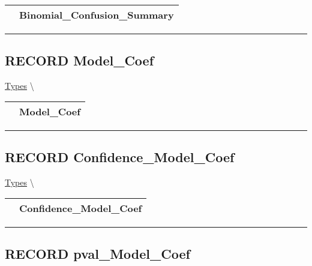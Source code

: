 {\renewcommand{\arraystretch}{1.5}
\begin{tabularx}{\textwidth}{|>{\raggedright\arraybackslash}l|X|}
\hline
\hspace{0pt}\mytexttt{\color{red} } & \textbf{Binomial\_Confusion\_Summary} \\
\hline
\end{tabularx}
}

\par


\rule{\linewidth}{0.5pt}
\subsection*{\textsf{\colorbox{headtoc}{\color{white} RECORD}
Model\_Coef}}

\hypertarget{ecldoc:logisticregression.types.model_coef}{}
\hspace{0pt} \hyperlink{ecldoc:LogisticRegression.Types}{Types} \textbackslash 

{\renewcommand{\arraystretch}{1.5}
\begin{tabularx}{\textwidth}{|>{\raggedright\arraybackslash}l|X|}
\hline
\hspace{0pt}\mytexttt{\color{red} } & \textbf{Model\_Coef} \\
\hline
\end{tabularx}
}

\par


\rule{\linewidth}{0.5pt}
\subsection*{\textsf{\colorbox{headtoc}{\color{white} RECORD}
Confidence\_Model\_Coef}}

\hypertarget{ecldoc:logisticregression.types.confidence_model_coef}{}
\hspace{0pt} \hyperlink{ecldoc:LogisticRegression.Types}{Types} \textbackslash 

{\renewcommand{\arraystretch}{1.5}
\begin{tabularx}{\textwidth}{|>{\raggedright\arraybackslash}l|X|}
\hline
\hspace{0pt}\mytexttt{\color{red} } & \textbf{Confidence\_Model\_Coef} \\
\hline
\end{tabularx}
}

\par


\rule{\linewidth}{0.5pt}
\subsection*{\textsf{\colorbox{headtoc}{\color{white} RECORD}
pval\_Model\_Coef}}

